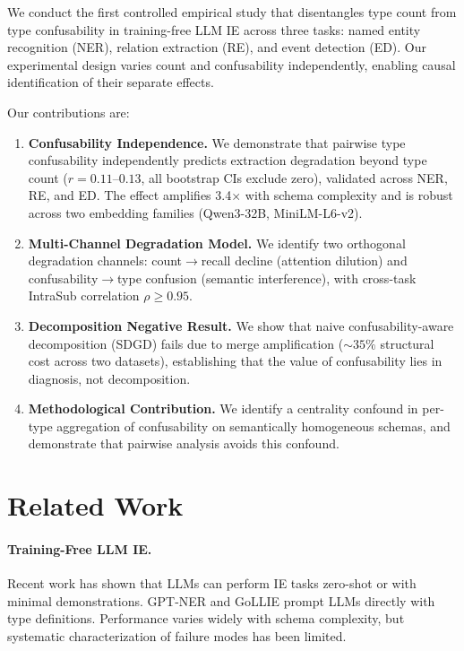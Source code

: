 \documentclass[11pt,a4paper]{article}
\begin{document}
We conduct the first controlled empirical study that disentangles type count from type confusability in training-free LLM IE across three tasks: named entity recognition (NER), relation extraction (RE), and event detection (ED).
Our experimental design varies count and confusability independently, enabling causal identification of their separate effects.

Our contributions are:
\begin{enumerate}
\item \textbf{Confusability Independence.} We demonstrate that pairwise type confusability independently predicts extraction degradation beyond type count ($r{=}0.11$--$0.13$, all bootstrap CIs exclude zero), validated across NER, RE, and ED. The effect amplifies 3.4$\times$ with schema complexity and is robust across two embedding families (Qwen3-32B, MiniLM-L6-v2).

\item \textbf{Multi-Channel Degradation Model.} We identify two orthogonal degradation channels: count$\to$recall decline (attention dilution) and confusability$\to$type confusion (semantic interference), with cross-task IntraSub correlation $\rho{\geq}0.95$.

\item \textbf{Decomposition Negative Result.} We show that naive confusability-aware decomposition (SDGD) fails due to merge amplification (${\sim}35\%$ structural cost across two datasets), establishing that the value of confusability lies in diagnosis, not decomposition.

\item \textbf{Methodological Contribution.} We identify a centrality confound in per-type aggregation of confusability on semantically homogeneous schemas, and demonstrate that pairwise analysis avoids this confound.
\end{enumerate}

\section{Related Work}

\paragraph{Training-Free LLM IE.}
Recent work has shown that LLMs can perform IE tasks zero-shot or with minimal demonstrations.
GPT-NER \cite{li2023gptner} and GoLLIE \cite{sainz2024gollie} prompt LLMs directly with type definitions.
Performance varies widely with schema complexity, but systematic characterization of failure modes has been limited.
\end{document}
